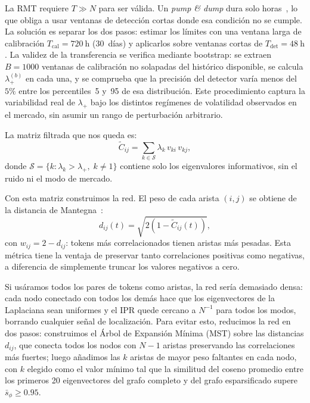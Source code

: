 La RMT requiere $T \gg N$ para ser válida. Un \emph{pump \& dump} dura
solo horas~\cite{lamorgia2020}, lo que obliga a usar ventanas de detección
cortas donde esa condición no se cumple. La solución es separar los dos
pasos: estimar los límites con una ventana larga de calibración
$T_{\text{cal}} = 720~\text{h}$ (30~días) y aplicarlos sobre ventanas
cortas de $T_{\text{det}} = 48~\text{h}$. La validez de la transferencia
se verifica mediante bootstrap: se extraen $B = 1000$ ventanas de
calibración no solapadas del histórico disponible, se calcula
$\lambda_+^{(b)}$ en cada una, y se comprueba que la precisión del
detector varía menos del $5\%$ entre los percentiles~5 y~95 de esa
distribución. Este procedimiento captura la variabilidad real de
$\lambda_+$ bajo los distintos regímenes de volatilidad observados en el
mercado, sin asumir un rango de perturbación arbitrario.

La matriz filtrada que nos queda es:
\begin{equation}
  \tilde{C}_{ij} = \sum_{k \in \mathcal{S}} \lambda_k\, v_{ki}\, v_{kj},
  \label{eq:Ctilde}
\end{equation}
donde $\mathcal{S} = \{k : \lambda_k > \lambda_+,\; k \neq 1\}$ contiene solo
los eigenvalores informativos, sin el ruido ni el modo de mercado.

Con esta matriz construimos la red. El peso de cada arista $(i,j)$ se obtiene
de la distancia de Mantegna~\cite{mantegna1999}:
\begin{equation}
  d_{ij}(t) = \sqrt{2\left(1 - \tilde{C}_{ij}(t)\right)},
  \label{eq:mantegna}
\end{equation}
con $w_{ij} = 2 - d_{ij}$: tokens más correlacionados tienen aristas más
pesadas. Esta métrica tiene la ventaja de preservar tanto correlaciones
positivas como negativas, a diferencia de simplemente truncar los valores
negativos a cero.

Si usáramos todos los pares de tokens como aristas, la red sería
demasiado densa: cada nodo conectado con todos los demás hace que los
eigenvectores de la Laplaciana sean uniformes y el IPR quede cercano a
$N^{-1}$ para todos los modos, borrando cualquier señal de localización. Para
evitar esto, reducimos la red en dos pasos: construimos el Árbol de
Expansión Mínima (MST) sobre las distancias $d_{ij}$, que conecta todos
los nodos con $N-1$ aristas preservando las correlaciones más fuertes;
luego añadimos las $k$ aristas de mayor peso faltantes en cada nodo,
con $k$ elegido como el valor mínimo tal que la similitud del coseno
promedio entre los primeros 20 eigenvectores del grafo completo y del
grafo esparsificado supere $\bar{s}_\phi \geq 0.95$.

